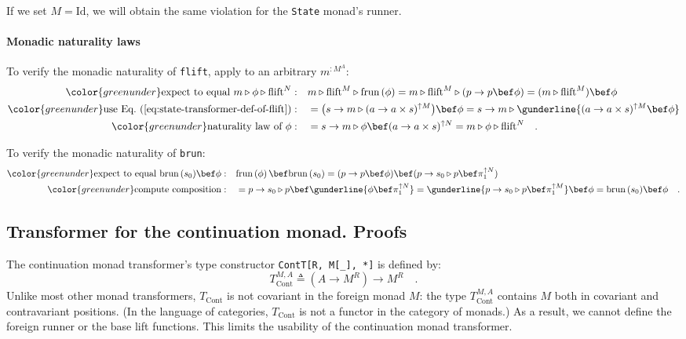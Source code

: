 If we set $M=\text{Id}$, we will obtain the same violation for the
\lstinline!State! monad\textsf{'}s runner.

\paragraph{Monadic naturality laws}

To verify the monadic naturality of \lstinline!flift!, apply to an
arbitrary $m^{:M^{A}}$:
\begin{align*}
{\color{greenunder}\text{expect to equal }m\triangleright\phi\triangleright\text{flift}^{N}:}\quad & m\triangleright\text{flift}^{M}\triangleright\text{frun}\left(\phi\right)=m\triangleright\text{flift}^{M}\triangleright(p\rightarrow p\bef\phi)=(m\triangleright\text{flift}^{M})\bef\phi\\
{\color{greenunder}\text{use Eq.~(\ref{eq:state-transformer-def-of-flift})}:}\quad & =\big(s\rightarrow m\triangleright(a\rightarrow a\times s)^{\uparrow M}\big)\bef\phi=s\rightarrow m\triangleright\gunderline{(a\rightarrow a\times s)^{\uparrow M}\bef\phi}\\
{\color{greenunder}\text{naturality law of }\phi:}\quad & =s\rightarrow m\triangleright\phi\bef(a\rightarrow a\times s)^{\uparrow N}=m\triangleright\phi\triangleright\text{flift}^{N}\quad.
\end{align*}

To verify the monadic naturality of \lstinline!brun!:
\begin{align*}
{\color{greenunder}\text{expect to equal }\text{brun}\,(s_{0})\bef\phi:}\quad & \text{frun}\left(\phi\right)\bef\text{brun}\,(s_{0})=(p\rightarrow p\bef\phi)\bef(p\rightarrow s_{0}\triangleright p\bef\pi_{1}^{\uparrow N})\\
{\color{greenunder}\text{compute composition}:}\quad & =p\rightarrow s_{0}\triangleright p\bef\gunderline{\phi\bef\pi_{1}^{\uparrow N}}=\gunderline{p\rightarrow s_{0}\triangleright p\bef\pi_{1}^{\uparrow M}}\bef\phi=\text{brun}\,(s_{0})\bef\phi\quad.
\end{align*}


\subsection{Transformer for the continuation monad. Proofs}

The continuation monad transformer\textsf{'}s type constructor \lstinline!ContT[R, M[_], *]!
is defined by:
\[
T_{\text{Cont}}^{M,A}\triangleq(A\rightarrow M^{R})\rightarrow M^{R}\quad.
\]
Unlike most other monad transformers, $T_{\text{Cont}}$ is not covariant
in the foreign monad $M$: the type $T_{\text{Cont}}^{M,A}$ contains
$M$ both in covariant and contravariant positions. (In the language
of categories, $T_{\text{Cont}}$ is not a functor in the category
of monads.) As a result, we cannot define the foreign runner or the
base lift functions. This limits the usability of the continuation
monad transformer. 

